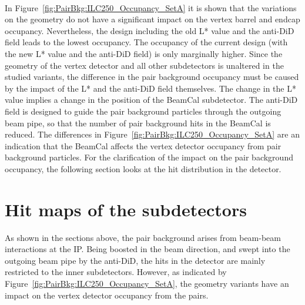 \\In Figure~\ref{fig:PairBkg:ILC250_Occupancy_SetA} it is shown that the variations on the \sid geometry do not have a significant impact on the vertex barrel and endcap occupancy. 
Nevertheless, the \sid design including the old L* value and the anti-DiD field leads to the lowest occupancy.
The occupancy of the current design (with the new L* value and the anti-DiD field) is only marginally higher.
Since the geometry of the vertex detector and all other subdetectors is unaltered in the studied \sid variants, the difference in the pair background occupancy must be caused by the impact of the L* and the anti-DiD field themselves.
The change in the L* value implies a change in the position of the BeamCal subdetector.
The anti-DiD field is designed to guide the pair background particles through the outgoing beam pipe, so that the number of pair background hits in the BeamCal is reduced.
The differences in Figure~\ref{fig:PairBkg:ILC250_Occupancy_SetA} are an indication that the \sid BeamCal affects the vertex detector occupancy from pair background particles.
For the clarification of the impact on the pair background occupancy, the following section looks at the hit distribution in the \sid detector.


\section{Hit maps of the \sid subdetectors}
\label{PairBkg:hitmaps}
As shown in the sections above, the \positron\electron pair background arises from beam-beam interactions at the IP.
Being boosted in the beam direction, and swept into the outgoing beam pipe by the anti-DiD, the hits in the \sid detector are mainly restricted to the inner subdetectors.
However, as indicated by Figure~\ref{fig:PairBkg:ILC250_Occupancy_SetA}, the \sid geometry variants have an impact on the vertex detector occupancy from the \positron\electron pairs.

